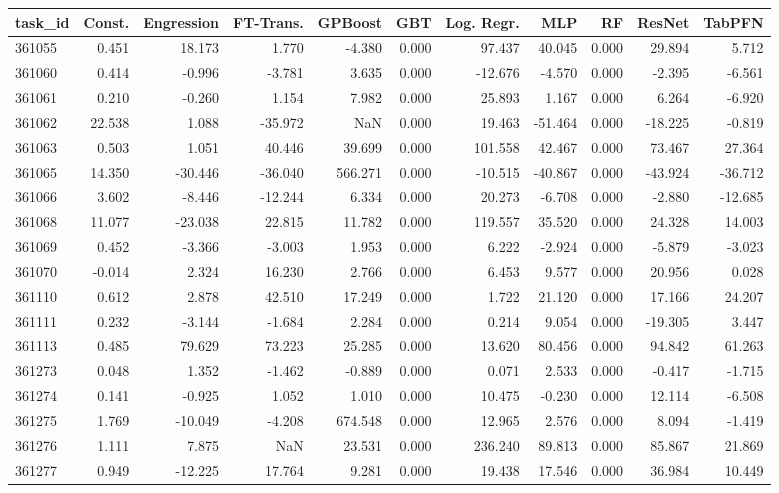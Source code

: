 \begin{tabular}{lrrrrrrrrrr}
\toprule
task\_id & Const. & Engression & FT-Trans. & GPBoost & GBT & Log. Regr. & MLP & RF & ResNet & TabPFN \\
\midrule
361055 & 0.451 & 18.173 & 1.770 & -4.380 & 0.000 & 97.437 & 40.045 & 0.000 & 29.894 & 5.712 \\
361060 & 0.414 & -0.996 & -3.781 & 3.635 & 0.000 & -12.676 & -4.570 & 0.000 & -2.395 & -6.561 \\
361061 & 0.210 & -0.260 & 1.154 & 7.982 & 0.000 & 25.893 & 1.167 & 0.000 & 6.264 & -6.920 \\
361062 & 22.538 & 1.088 & -35.972 & NaN & 0.000 & 19.463 & -51.464 & 0.000 & -18.225 & -0.819 \\
361063 & 0.503 & 1.051 & 40.446 & 39.699 & 0.000 & 101.558 & 42.467 & 0.000 & 73.467 & 27.364 \\
361065 & 14.350 & -30.446 & -36.040 & 566.271 & 0.000 & -10.515 & -40.867 & 0.000 & -43.924 & -36.712 \\
361066 & 3.602 & -8.446 & -12.244 & 6.334 & 0.000 & 20.273 & -6.708 & 0.000 & -2.880 & -12.685 \\
361068 & 11.077 & -23.038 & 22.815 & 11.782 & 0.000 & 119.557 & 35.520 & 0.000 & 24.328 & 14.003 \\
361069 & 0.452 & -3.366 & -3.003 & 1.953 & 0.000 & 6.222 & -2.924 & 0.000 & -5.879 & -3.023 \\
361070 & -0.014 & 2.324 & 16.230 & 2.766 & 0.000 & 6.453 & 9.577 & 0.000 & 20.956 & 0.028 \\
361110 & 0.612 & 2.878 & 42.510 & 17.249 & 0.000 & 1.722 & 21.120 & 0.000 & 17.166 & 24.207 \\
361111 & 0.232 & -3.144 & -1.684 & 2.284 & 0.000 & 0.214 & 9.054 & 0.000 & -19.305 & 3.447 \\
361113 & 0.485 & 79.629 & 73.223 & 25.285 & 0.000 & 13.620 & 80.456 & 0.000 & 94.842 & 61.263 \\
361273 & 0.048 & 1.352 & -1.462 & -0.889 & 0.000 & 0.071 & 2.533 & 0.000 & -0.417 & -1.715 \\
361274 & 0.141 & -0.925 & 1.052 & 1.010 & 0.000 & 10.475 & -0.230 & 0.000 & 12.114 & -6.508 \\
361275 & 1.769 & -10.049 & -4.208 & 674.548 & 0.000 & 12.965 & 2.576 & 0.000 & 8.094 & -1.419 \\
361276 & 1.111 & 7.875 & NaN & 23.531 & 0.000 & 236.240 & 89.813 & 0.000 & 85.867 & 21.869 \\
361277 & 0.949 & -12.225 & 17.764 & 9.281 & 0.000 & 19.438 & 17.546 & 0.000 & 36.984 & 10.449 \\

\end{tabular}
